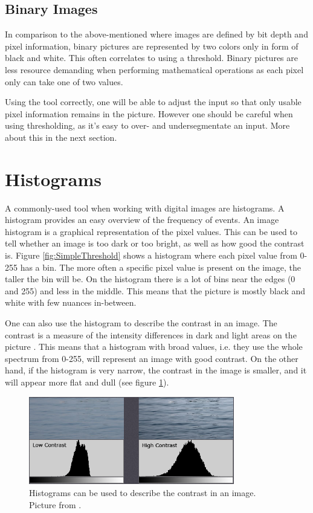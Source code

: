 \subsection{Binary Images}
In comparison to the above-mentioned where images are defined by bit depth and pixel information, binary pictures are represented by two colors only in form of black and white. This often correlates to using a threshold. Binary pictures are less resource demanding when performing mathematical operations as each pixel only can take one of two values.

Using the tool correctly, one will be able to adjust the input so that only usable pixel information remains in the picture. However one should be careful when using thresholding, as it's easy to over- and undersegmentate an input. More about this in the next section.

\section{Histograms}
A commonly-used tool when working with digital images are histograms. A histogram provides an easy overview of the frequency of events. An image histogram is a graphical representation of the pixel values. This can be used to tell whether an image is too dark or too bright, as well as how good the contrast is\citep{ip_book}. Figure \ref{fig:SimpleThreshold} shows a histogram where each pixel value from 0-255 has a bin. The more often a specific pixel value is present on the image, the taller the bin will be. On the histogram there is a lot of bins near the edges (0 and 255) and less in the middle. This means that the picture is mostly black and white with few nuances in-between.

One can also use the histogram to describe the contrast in an image. The contrast is a measure of the intensity differences in dark and light areas on the picture \citep{histogram}. This means that a histogram with broad values, i.e. they use the whole spectrum from 0-255, will represent an image with good contrast. On the other hand, if the histogram is very narrow, the contrast in the image is smaller, and it will appear more flat and dull (see figure \ref{fig:histogram_contrast}).

\begin{figure}[htbp]
\centering
\includegraphics[width=0.80\textwidth]{Pictures/Theory/hisogram_contrast.png}
\caption{Histograms can be used to describe the contrast in an image. Picture from \citep{histogram}.}
\label{fig:histogram_contrast}
\end{figure}

